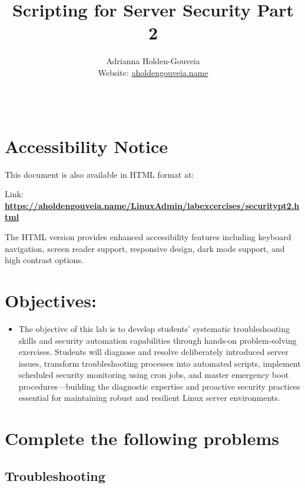 \documentclass[12pt]{article}
\title{Scripting for Server Security Part 2}
\author{
        Adrianna Holden-Gouveia \\
        Website: \href{https://aholdengouveia.name}{aholdengouveia.name}\\ 
        \date{\vspace{-5ex}}
        \faGithub {: aholdengouveia} \\
        }
\begin{document}
    

\maketitle



\section*{Accessibility Notice}
This document is also available in HTML format at:

Link: \href{https://aholdengouveia.name/LinuxAdmin/labexcercises/securitypt2.html}{\textbf{https://aholdengouveia.name/LinuxAdmin/labexcercises/securitypt2.html}}

The HTML version provides enhanced accessibility features including keyboard navigation, screen reader support, responsive design, dark mode support, and high contrast options.

\section*{Objectives:}
\begin{itemize}
    \item The objective of this lab is to develop students' systematic troubleshooting skills and security automation capabilities through hands-on problem-solving exercises. Students will diagnose and resolve deliberately introduced server issues, transform troubleshooting processes into automated scripts, implement scheduled security monitoring using cron jobs, and master emergency boot procedures—building the diagnostic expertise and proactive security practices essential for maintaining robust and resilient Linux server environments.
\end{itemize}
\section*{Complete the following problems}

\subsection*{Troubleshooting}

\end{document}
